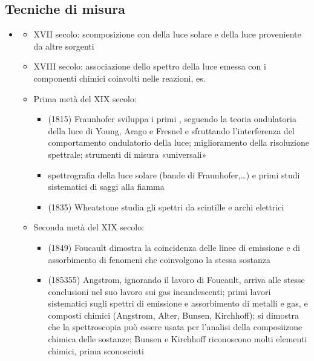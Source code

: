 \documentclass[letterpaper,10pt,italian]{jupyterBook}
\begin{document}
\subsection{Tecniche di misura}
\label{\detokenize{ch/modern:tecniche-di-misura}}\begin{itemize}
\item {} 
\sphinxAtStartPar
{}
\begin{itemize}
\item {} 
\sphinxAtStartPar
XVII secolo: scomposizione con  della luce solare e della luce proveniente da altre sorgenti

\item {} 
\sphinxAtStartPar
XVIII secolo: associazione dello spettro della luce emessa con i componenti chimici coinvolti nelle reazioni, es. 

\item {} 
\sphinxAtStartPar
Prima metà del XIX secolo:
\begin{itemize}
\item {} 
\sphinxAtStartPar
(1815) Fraunhofer sviluppa i primi , seguendo la teoria ondulatoria della luce di Young, Arago e Fresnel e sfruttando l’interferenza del comportamento ondulatorio della luce; miglioramento della risoluzione spettrale; strumenti di misura «universali»

\item {} 
\sphinxAtStartPar
spettrografia della luce solare (bande di Fraunhofer,…) e primi studi sistematici di saggi alla fiamma

\item {} 
\sphinxAtStartPar
(1835) Wheatstone studia gli spettri da scintille e archi elettrici

\end{itemize}

\item {} 
\sphinxAtStartPar
Seconda metà del XIX secolo:
\begin{itemize}
\item {} 
\sphinxAtStartPar
(1849) Foucault dimostra la coincidenza delle linee di emissione e di assorbimento di fenomeni che coinvolgono la stessa sostanza

\item {} 
\sphinxAtStartPar
(1853\sphinxhyphen{}55) Angstrom, ignorando il lavoro di Foucault, arriva alle stesse conclusioni nel suo lavoro sui gas incandescenti; primi lavori sistematici sugli spettri di emissione e assorbimento di metalli e gas, e composti chimici (Angstrom, Alter, Bunsen, Kirchhoff); si dimostra che la spettroscopia può essere usata per l’analisi della composiizone chimica delle sostanze; Bunsen e Kirchhoff riconoscono molti elementi chimici, prima sconosciuti


\end{itemize}
\end{itemize}
\end{itemize}
\end{document}
